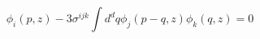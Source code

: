 \begin{equation}
[z^2 \partial_z^2+(1-d)z \partial_z-z^2p^2-m^2)]
\phi_i(p,z)-3 \sigma^{ijk} \int d^dq \phi_j(p-q,z)\phi_k(q,z)=0
\end{equation}

